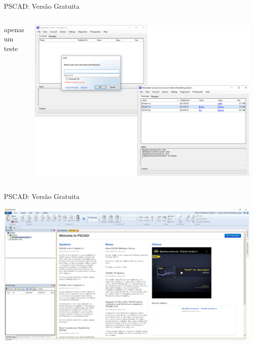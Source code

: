 




\begin{frame}{PSCAD: Versão Gratuita}
\centering

\begin{columns}
apenas um teste

\centering
\includegraphics[width=0.8\linewidth]{./figuras/Primeiros-Passos/login}

\end{columns}

\end{frame}


\begin{frame}{PSCAD: Versão Gratuita}
\centering


\includegraphics[width=0.85\linewidth]{./figuras/Primeiros-Passos/tela_inicial}


\end{frame}





